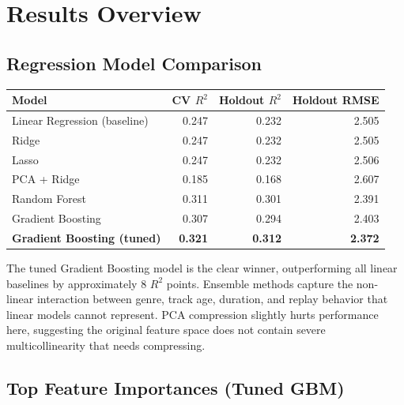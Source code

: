 \documentclass[11pt, letterpaper]{article}
\begin{document}
\section{Results Overview}

\subsection{Regression Model Comparison}

\begin{center}
\begin{tabular}{lrrr}
\toprule
\textbf{Model} & \textbf{CV $R^2$} & \textbf{Holdout $R^2$} & \textbf{Holdout RMSE} \\
\midrule
Linear Regression (baseline) & 0.247 & 0.232 & 2.505 \\
Ridge                         & 0.247 & 0.232 & 2.505 \\
Lasso                         & 0.247 & 0.232 & 2.506 \\
PCA + Ridge                   & 0.185 & 0.168 & 2.607 \\
Random Forest                 & 0.311 & 0.301 & 2.391 \\
Gradient Boosting             & 0.307 & 0.294 & 2.403 \\
\textbf{Gradient Boosting (tuned)} & \textbf{0.321} & \textbf{0.312} & \textbf{2.372} \\
\bottomrule
\end{tabular}
\end{center}

\vspace{0.5em}

The tuned Gradient Boosting model is the clear winner, outperforming all
linear baselines by approximately 8 $R^2$ points. Ensemble methods capture
the non-linear interaction between genre, track age, duration, and
replay behavior that linear models cannot represent. PCA compression
slightly hurts performance here, suggesting the original feature space
does not contain severe multicollinearity that needs compressing.

\subsection{Top Feature Importances (Tuned GBM)}
\end{document}
